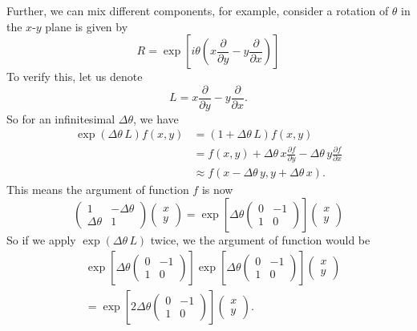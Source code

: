 \documentclass{article}
\begin{document}
Further, we can mix different components, for example,
consider a rotation of $\theta$ in the $x$-$y$ plane is given by
$$
R = \exp\left[i\theta \left(x \frac{\partial}{\partial y} - y \frac{\partial }{\partial x} \right) \right]
$$
To verify this, let us denote
$$
L = x \frac{\partial}{\partial y} - y \frac{\partial }{\partial x}.
$$
So for an infinitesimal $\Delta \theta$, we have
$$
\begin{aligned}
\exp( \Delta \theta \, L) f(x, y)
&= (1 + \Delta \theta \, L) f(x, y) \\
&= f(x, y) + \Delta \theta \, x \frac{ \partial f } { \partial y }
- \Delta \theta \, y \frac{ \partial f } { \partial x }
\\
&\approx f(x - \Delta \theta \, y, y + \Delta \theta \, x).
\end{aligned}
$$
This means the argument of function $f$ is now
$$
\left(
  \begin{array}{ccc}
    1 & -\Delta \theta \\
    \Delta \theta & 1
  \end{array}
\right)
\left(
  \begin{array}{ccc}
    x \\
    y
  \end{array}
\right)
=
\exp\left[\Delta \theta \left(
  \begin{array}{ccc}
    0 & -1 \\
    1 & 0
  \end{array}
\right)
\right]
\left(
  \begin{array}{ccc}
    x \\
    y
  \end{array}
\right)
$$
So if we apply $\exp(\Delta \theta \, L)$ twice,
we the argument of function would be
$$
\begin{aligned}
&
\exp\left[
  \Delta \theta
\left(
  \begin{array}{ccc}
    0 & -1 \\
    1 & 0
  \end{array}
\right)\right]
\exp\left[
  \Delta \theta
\left(
  \begin{array}{ccc}
    0 & -1 \\
    1 & 0
  \end{array}
\right)\right]
\left(
  \begin{array}{ccc}
    x \\
    y
  \end{array}
\right)
\\
&=
\exp\left[
  2\Delta \theta
\left(
  \begin{array}{ccc}
    0 & -1 \\
    1 & 0
  \end{array}
\right)\right]
\left(
  \begin{array}{ccc}
    x \\
    y
  \end{array}
\right).
\end{aligned}
$$
\end{document}
